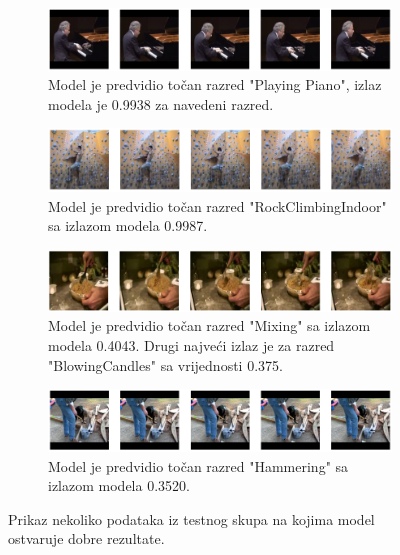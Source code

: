 \documentclass[times, utf8, diplomski,  numeric]{fer}
\begin{document}
\begin{figure}[htp]
\begin{subfigure}{\textwidth}

\centering
\includegraphics[width=\textwidth]{./images/playing_piano}\hfill

\caption{Model je predvidio točan razred "Playing Piano", izlaz modela je 0.9938 za navedeni razred.}
\label{fig:playingpiano}
\end{subfigure}
\begin{subfigure}{\textwidth}

\centering
\includegraphics[width=\textwidth]{./images/rockclimbing}\hfill

\caption{Model je predvidio točan razred "RockClimbingIndoor" sa izlazom modela 0.9987.}
\label{fig:rockclimbing}
\end{subfigure}
\begin{subfigure}{\textwidth}

\centering
\includegraphics[width=\textwidth]{./images/mixing}\hfill

\caption{Model je predvidio točan razred "Mixing" sa izlazom modela 0.4043. Drugi najveći izlaz je za razred "BlowingCandles" sa vrijednosti 0.375.}
\label{fig:mixing}
\end{subfigure}
\begin{subfigure}{\textwidth}

\centering
\includegraphics[width=\textwidth]{./images/hammering2}\hfill

\caption{Model je predvidio točan razred "Hammering" sa izlazom modela 0.3520.}
\label{fig:hammering2}
\end{subfigure}
\caption{Prikaz nekoliko podataka iz testnog skupa na kojima model ostvaruje dobre rezultate.}
\end{figure}
\end{document}
